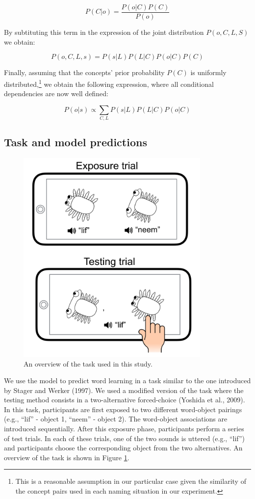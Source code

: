 \documentclass[english,,man,floatsintext]{apa6}
\let\rmarkdownfootnote\footnote%
\def\footnote{\protect\rmarkdownfootnote}
\theoremstyle{definition}
\theoremstyle{definition}
\theoremstyle{definition}
\theoremstyle{remark}
\begin{document}
\[P(C|o) = \frac{P(o|C)P(C)}{P(o)}\]

By subtituting this term in the expression of the joint distribution
\(P(o,C,L,S)\) we obtain:

\[P(o,C,L,s) = P(s|L)P(L|C)P(o|C)P(C)\]

Finally, assuming that the concepts' prior probability \(P(C)\) is
uniformly
distributed,\footnote{This is a reasonable assumption in our particular case given the similarity of the concept pairs used in each naming situation in our experiment.}
we obtain the following expression, where all conditional dependencies
are now well defined:

\begin{equation} \label{eq:general}
P(o|s) \propto \sum_{C,L}  P(s|L)P(L|C)P(o|C)
\end{equation}

\subsection{Task and model
predictions}\label{task-and-model-predictions}

\begin{figure}[t]

{\centering \includegraphics[width=3.75in]{figs/task} 

}

\caption{An overview of the task used in this study.}\label{fig:task}
\end{figure}

We use the model to predict word learning in a task similar to the one
introduced by Stager and Werker (1997). We used a modified version of
the task where the testing method consists in a two-alternative
forced-choice (Yoshida et al., 2009). In this task, participants are
first exposed to two different word-object pairings (e.g., \enquote{lif}
- object 1, \enquote{neem} - object 2). The word-object associations are
introduced sequentially. After this exposure phase, participants perform
a series of test trials. In each of these trials, one of the two sounds
is uttered (e.g., \enquote{lif}) and participants choose the
corresponding object from the two alternatives. An overview of the task
is shown in Figure \ref{fig:task}.
\end{document}
